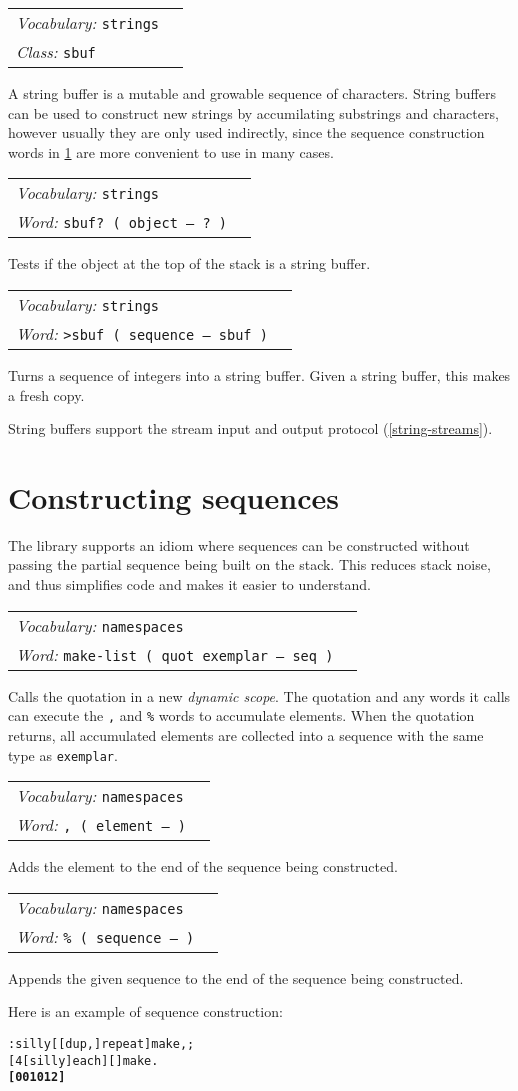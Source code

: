 \documentclass{book}
\newcommand{\tto}{\symbol{123}}
\newcommand{\ttc}{\symbol{125}}
\newcommand{\vocabulary}[1]{\emph{Vocabulary:} \texttt{#1}&\\}
\newcommand{\ordinaryword}[2]{\index{\texttt{#1}}\emph{Word:} \texttt{#2}&\\}
\newcommand{\classword}[1]{\index{\texttt{#1}}\emph{Class:} \texttt{#1}&\\}
\newcommand{\wordtable}[1]{


\begin{tabularx}{12cm}{lX}
\hline
#1
\hline
\end{tabularx}

}
\begin{document}
\sbufglos
\wordtable{
\vocabulary{strings}
\classword{sbuf}
}
A string buffer is a mutable and growable sequence of characters. String buffers can be used to construct new strings by accumilating substrings and characters, however usually they are only used indirectly, since the sequence construction words in \ref{make-seq} are more convenient to use in many cases.
\wordtable{
\vocabulary{strings}
\ordinaryword{sbuf?}{sbuf?~( object -- ?~)}
}
Tests if the object at the top of the stack is a string buffer.
\wordtable{
\vocabulary{strings}
\ordinaryword{>sbuf}{>sbuf~( sequence -- sbuf )}
}
Turns a sequence of integers into a string buffer. Given a string buffer, this makes a fresh copy.

String buffers support the stream input and output protocol (\ref{string-streams}).

\section{Constructing sequences}\label{make-seq}

The library supports an idiom where sequences can be constructed without passing the partial sequence being built on the stack. This reduces stack noise, and thus simplifies code and makes it easier to understand.

\newcommand{\dynamicscopeglos}{}
\dynamicscopeglos
\wordtable{
\vocabulary{namespaces}
\ordinaryword{make}{make-list ( quot exemplar -- seq )}
}
Calls the quotation in a new \emph{dynamic scope}. The quotation and any words it calls can execute the \texttt{,} and \texttt{\%} words to accumulate elements. When the quotation returns, all accumulated elements are collected into a sequence with the same type as \verb|exemplar|.
\wordtable{
\vocabulary{namespaces}
\ordinaryword{,}{,~( element -- )}
}
Adds the element to the end of the sequence being constructed.
\wordtable{
\vocabulary{namespaces}
\ordinaryword{\%}{\% ( sequence -- )}
}
Appends the given sequence to the end of the sequence being constructed.

Here is an example of sequence construction:
\begin{alltt}
  : silly [ [ dup , ] repeat ] \tto \ttc make , ;
  [ 4 [ silly ] each ] [ ] make .
\textbf{[ \tto \ttc \tto 0 \ttc \tto 0 1 \ttc \tto 0 1 2 \ttc ]}
\end{alltt}
\end{document}

